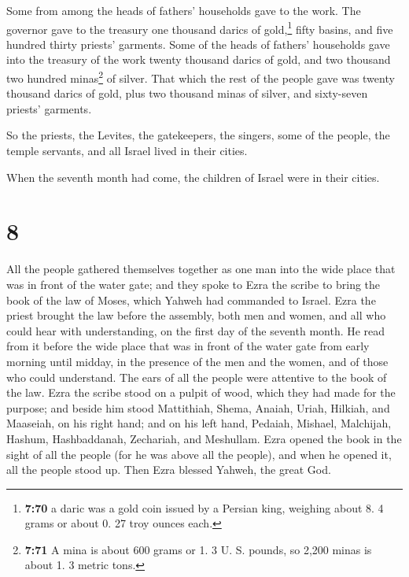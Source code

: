  Some from among the heads of fathers' households gave to
the work. The governor gave to the treasury one thousand darics of
gold,\footnote{\textbf{7:70} a daric was a gold coin issued by a Persian
  king, weighing about 8. 4 grams or about 0. 27 troy ounces each.}
fifty basins, and five hundred thirty priests' garments. 
Some of the heads of fathers' households gave into the treasury of the
work twenty thousand darics of gold, and two thousand two hundred
minas\footnote{\textbf{7:71} A mina is about 600 grams or 1. 3 U. S.
  pounds, so 2,200 minas is about 1. 3 metric tons.} of silver.
 That which the rest of the people gave was twenty
thousand darics of gold, plus two thousand minas of silver, and
sixty-seven priests' garments.

 So the priests, the Levites, the gatekeepers, the
singers, some of the people, the temple servants, and all Israel lived
in their cities.

When the seventh month had come, the children of Israel were in their
cities.

\hypertarget{section-7}{%
\section{8}\label{section-7}}

 All the people gathered themselves together as one man
into the wide place that was in front of the water gate; and they spoke
to Ezra the scribe to bring the book of the law of Moses, which Yahweh
had commanded to Israel.  Ezra the priest brought the law
before the assembly, both men and women, and all who could hear with
understanding, on the first day of the seventh month.  He
read from it before the wide place that was in front of the water gate
from early morning until midday, in the presence of the men and the
women, and of those who could understand. The ears of all the people
were attentive to the book of the law.  Ezra the scribe
stood on a pulpit of wood, which they had made for the purpose; and
beside him stood Mattithiah, Shema, Anaiah, Uriah, Hilkiah, and
Maaseiah, on his right hand; and on his left hand, Pedaiah, Mishael,
Malchijah, Hashum, Hashbaddanah, Zechariah, and Meshullam.
 Ezra opened the book in the sight of all the people (for
he was above all the people), and when he opened it, all the people
stood up.  Then Ezra blessed Yahweh, the great God.

